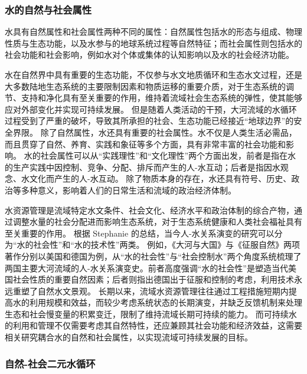 \subsubsection{水的自然与社会属性}

水具有自然属性和社会属性两种不同的属性\cite{ning2004}：自然属性包括水的形态与组成、物理性质与生态功能，以及水参与的地球系统过程等自然特征；而社会属性则包括水的社会功能和社会影响，例如水对个体或集体的认知影响以及水的社会经济功能。

水在自然界中具有重要的生态功能，不仅参与水文地质循环和生态水文过程，还是大多数陆地生态系统的主要限制因素和物质运移的重要介质，对于生态系统的调节、支持和净化具有至关重要的作用，维持着流域社会生态系统的弹性，使其能够应对外部变化并实现可持续发展\cite{gleeson2020a}。
但是随着人类活动的干预，大河流域的水循环过程受到了严重的破坏，导致其所承担的社会、生态功能已经接近“地球边界”的安全界限\cite{gleeson2020}。
除了自然属性，水还具有重要的社会属性。水不仅是人类生活必需品，而且贯穿了自然、养育、实践和象征等多个方面，具有非常丰富的社会功能和影响\cite{zhangyahui2008}。
水的社会属性可以从“实践理性”和“文化理性”两个方面出发，前者是指在水的生产实践中因控制、竞争、分配、排斥而产生的人-水互动；后者是指因水观念、水文化而产生的人-水互动\cite{zhangyahui2008}。
除了物质本身的存在，水还具有符号、历史、政治等多种意义，影响着人们的日常生活和流域的政治经济体制\cite{ballestero2019}。

水资源管理是流域特定水文条件、社会文化、经济水平和政治体制的综合产物，通过调整水量的社会分配进而影响生态系统，对于生态系统健康和人类社会福祉具有至关重要的作用。
根据 Stephanie 的总结\cite{scarrow2021}，当今人-水关系演变的研究可以分为“水的社会性”和“水的技术性”两类。
例如，《大河与大国》\cite{MaDing2021}与《征服自然》\cite{DaWei2019}两项著作分别以美国和德国为例，从“水的社会性”与“社会控制水”两个角度系统梳理了两国主要大河流域的人-水关系演变史。前者高度强调“水的社会性”是塑造当代美国社会性质的重要自然因素；后者则指出德国出于征服和控制的考虑，利用技术永远重塑了自然水文景观。
长期以来，流域水资源管理往往通过工程措施短期内提高水的利用规模和效益，而较少考虑系统状态的长期演变，并缺乏反馈机制来处理生态和社会慢变量的积累变迁，限制了维持流域长期可持续的能力\cite{falkenmark2021}。
而可持续水的利用和管理不仅需要考虑其自然特性，还应兼顾其社会功能和经济效益，这需要相关研究耦合水的自然和社会属性，以实现流域可持续发展的目标。

\subsubsection{自然-社会二元水循环}

